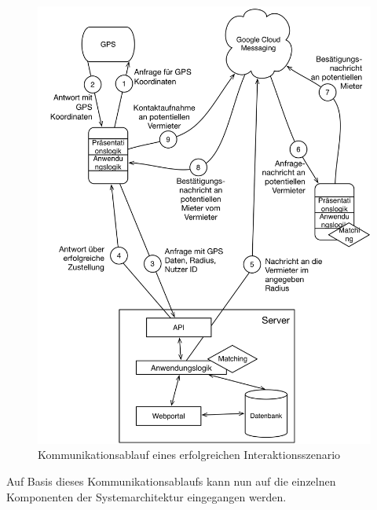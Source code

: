 \begin{figure}[H]
\includegraphics[width=.9\textwidth]{./images/kommunikationsablauf.png}
\caption{Kommunikationsablauf eines erfolgreichen Interaktionsszenario }
\label{fig:kommunikationsablauf}
\end{figure}

Auf Basis dieses Kommunikationsablaufs kann nun auf die einzelnen Komponenten der Systemarchitektur eingegangen werden.


